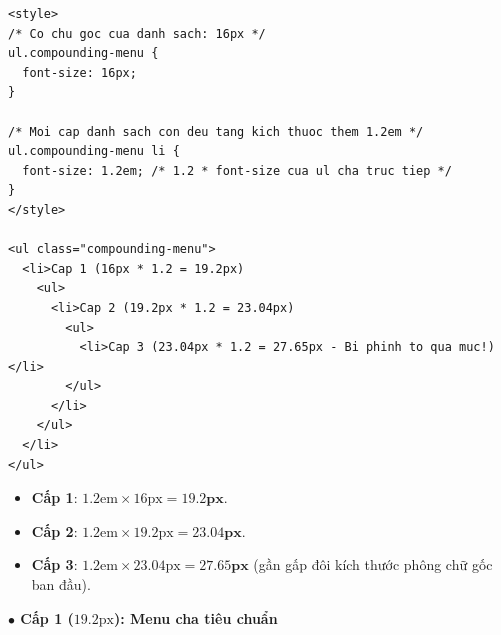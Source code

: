 \documentclass[11pt,oneside]{book}
\begin{document}
\begin{codeWindow}
\begin{lstlisting}[language=HTML5]
<style>
/* Co chu goc cua danh sach: 16px */
ul.compounding-menu {
  font-size: 16px;
}

/* Moi cap danh sach con deu tang kich thuoc them 1.2em */
ul.compounding-menu li {
  font-size: 1.2em; /* 1.2 * font-size cua ul cha truc tiep */
}
</style>

<ul class="compounding-menu">
  <li>Cap 1 (16px * 1.2 = 19.2px)
    <ul>
      <li>Cap 2 (19.2px * 1.2 = 23.04px)
        <ul>
          <li>Cap 3 (23.04px * 1.2 = 27.65px - Bi phinh to qua muc!)</li>
        </ul>
      </li>
    </ul>
  </li>
</ul>
\end{lstlisting}
\end{codeWindow}

\begin{conceptBox}
\begin{itemize}[leftmargin=1.5em, itemsep=2pt, parsep=0pt]
    \item \textbf{Cấp 1}: $1.2\text{em} \times 16\text{px} = \mathbf{19.2\text{px}}$.
    \item \textbf{Cấp 2}: $1.2\text{em} \times 19.2\text{px} = \mathbf{23.04\text{px}}$.
    \item \textbf{Cấp 3}: $1.2\text{em} \times 23.04\text{px} = \mathbf{27.65\text{px}}$ (gần gấp đôi kích thước phông chữ gốc ban đầu).
\end{itemize}
\end{conceptBox}

\begin{browserWindow}
\sffamily\small
\begin{tcolorbox}[enhanced, colback=white, colframe=primaryBlue!25, arc=6pt, boxrule=0.8pt, top=8pt, bottom=8pt, left=12pt, right=12pt]
  {\fontsize{13pt}{16pt}\selectfont \textcolor{primaryBlue}{\textbf{$\bullet$ Cấp 1 ($19.2\text{px}$): Menu cha tiêu chuẩn}}\par}
  \vspace{3pt}
  \vspace{3pt}
\end{tcolorbox}
\end{browserWindow}
\end{document}
